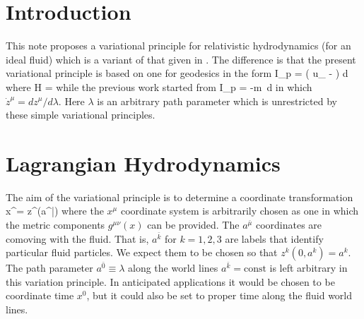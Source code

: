 %
%




\section{Introduction}\label{sec:intro_level1}

This note proposes a variational principle for relativistic
hydrodynamics (for an ideal fluid) which is a variant of that
given in \cite{A:CWM96}.  The difference is that the present
variational principle is based on one for geodesics in the form
\be
     I_p = \int \left(  u_{\mu} -
                   \right) d \lambda
\ee
where
\be
 {\mathcal H} =  \left[ g^{\mu\nu}(z) u_{\mu} u_{\nu}
                                    + 1 \right]
\ee
while the previous work \cite{A:CWM96} started from
\be
   I_p =  -m \int\!\! 
\,d\lambda
\ee
in which $\dot{z}^\mu = dz^\mu/d\lambda$.
Here $\lambda$ is an arbitrary path parameter which is
unrestricted by these simple variational principles.


\section{Lagrangian Hydrodynamics}\label{sec:1_part_level1}

The aim of the variational principle is to determine a coordinate
transformation
\be
   x^\mu = z^\mu(a^{\bar{\nu}})
\ee
where the $x^\mu$ coordinate system is arbitrarily chosen as one
in which the metric components $g^{\mu\nu}(x)$ can be provided.
The $a^{\bar{\mu}}$ coordinates are comoving with the fluid. That
is, $a^{\bar{k}}$ for $k=1,2,3$ are labels that identify
particular fluid particles.
We expect them to be chosen so that $z^k(0,a^k) = a^k$.
The path parameter $a^{\bar{0}} \equiv \lambda$ along the world
lines $a^{\bar{k}} = \mbox{const}$ is left arbitrary in this
variation principle.
In anticipated applications it would be chosen to be coordinate
time $x^0$, but it could also be set to proper time along the
fluid world lines.

